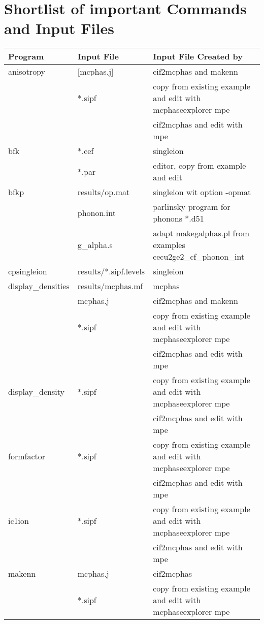 \section{Shortlist of important Commands and Input Files}\label{shortlist}
\small

\begin{table}
\label{tab:shortlist}
\begin{tabular}{lll}
\hline
Program	&	Input File	&	Input File Created by \\
\hline
anisotropy & 	[mcphas.j]	&	cif2mcphas and makenn \\
		&	*.sipf		&	copy from existing example and edit with mcphaseexplorer mpe \\
		&			&	cif2mcphas and edit with mpe \\	
bfk		&	*.cef		&     singleion \\
		&      *.par           &    editor, copy from example and edit \\	
bfkp          &  results/op.mat  & singleion wit option  -opmat  \\
                &   phonon.int     &     parlinsky program for phonons *.d51 \\
                &  g\_alpha.s      &  adapt makegalphas.pl from examples cecu2ge2\_cf\_phonon\_int \\  
cpsingleion	&	results/*.sipf.levels &	singleion \\
display\_densities &	results/mcphas.mf &	mcphas \\	
		&	mcphas.j	&	cif2mcphas and makenn \\
		&	*.sipf		&	copy from existing example and edit with mcphaseexplorer mpe \\
		&			&	cif2mcphas and edit with mpe \\		
display\_density &	*.sipf		&	copy from existing example and edit with mcphaseexplorer mpe \\
		&			&	cif2mcphas and edit with mpe \\
formfactor	&	*.sipf		&	copy from existing example and edit with mcphaseexplorer mpe \\
		&			&	cif2mcphas and edit with mpe \\	
ic1ion		&	*.sipf		&	copy from existing example and edit with mcphaseexplorer mpe \\
		&			&	cif2mcphas and edit with mpe \\
makenn		&	mcphas.j	&	cif2mcphas\\
		&	*.sipf		&	copy from existing example and edit with mcphaseexplorer mpe \\

\end{tabular}
\end{table}
